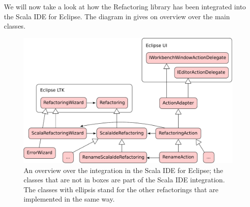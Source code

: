 \documentclass[10pt,a4paper,oneside]{scrreprt}
\begin{document}
We will now take a look at how the Refactoring library has been integrated into the Scala IDE for Eclipse. The diagram in  gives on overview over the main classes. 

\begin{figure}
  \centering
  \includegraphics[width=\linewidth]{eclipse-integration.pdf}
  \caption{An overview over the integration in the Scala IDE for Eclipse; the classes that are not in boxes are part of the Scala IDE integration. The classes with ellipsis stand for the other refactorings that are implemented in the same way.}
  \label{figure:eclipse-integration}
\end{figure}
\end{document}
